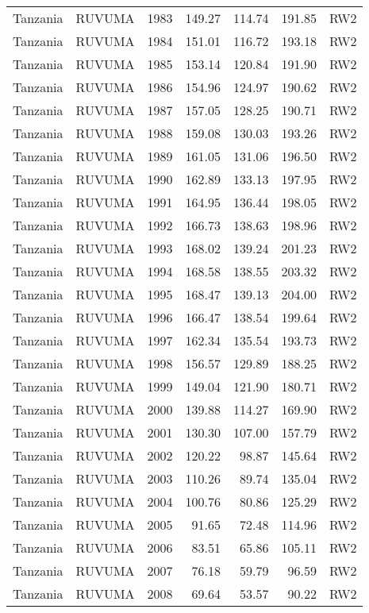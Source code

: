 \begin{longtable}{lllrrrl}
  Tanzania & RUVUMA & 1983 & 149.27 & 114.74 & 191.85 & RW2 \\ 
  Tanzania & RUVUMA & 1984 & 151.01 & 116.72 & 193.18 & RW2 \\ 
  Tanzania & RUVUMA & 1985 & 153.14 & 120.84 & 191.90 & RW2 \\ 
  Tanzania & RUVUMA & 1986 & 154.96 & 124.97 & 190.62 & RW2 \\ 
  Tanzania & RUVUMA & 1987 & 157.05 & 128.25 & 190.71 & RW2 \\ 
  Tanzania & RUVUMA & 1988 & 159.08 & 130.03 & 193.26 & RW2 \\ 
  Tanzania & RUVUMA & 1989 & 161.05 & 131.06 & 196.50 & RW2 \\ 
  Tanzania & RUVUMA & 1990 & 162.89 & 133.13 & 197.95 & RW2 \\ 
  Tanzania & RUVUMA & 1991 & 164.95 & 136.44 & 198.05 & RW2 \\ 
  Tanzania & RUVUMA & 1992 & 166.73 & 138.63 & 198.96 & RW2 \\ 
  Tanzania & RUVUMA & 1993 & 168.02 & 139.24 & 201.23 & RW2 \\ 
  Tanzania & RUVUMA & 1994 & 168.58 & 138.55 & 203.32 & RW2 \\ 
  Tanzania & RUVUMA & 1995 & 168.47 & 139.13 & 204.00 & RW2 \\ 
  Tanzania & RUVUMA & 1996 & 166.47 & 138.54 & 199.64 & RW2 \\ 
  Tanzania & RUVUMA & 1997 & 162.34 & 135.54 & 193.73 & RW2 \\ 
  Tanzania & RUVUMA & 1998 & 156.57 & 129.89 & 188.25 & RW2 \\ 
  Tanzania & RUVUMA & 1999 & 149.04 & 121.90 & 180.71 & RW2 \\ 
  Tanzania & RUVUMA & 2000 & 139.88 & 114.27 & 169.90 & RW2 \\ 
  Tanzania & RUVUMA & 2001 & 130.30 & 107.00 & 157.79 & RW2 \\ 
  Tanzania & RUVUMA & 2002 & 120.22 & 98.87 & 145.64 & RW2 \\ 
  Tanzania & RUVUMA & 2003 & 110.26 & 89.74 & 135.04 & RW2 \\ 
  Tanzania & RUVUMA & 2004 & 100.76 & 80.86 & 125.29 & RW2 \\ 
  Tanzania & RUVUMA & 2005 & 91.65 & 72.48 & 114.96 & RW2 \\ 
  Tanzania & RUVUMA & 2006 & 83.51 & 65.86 & 105.11 & RW2 \\ 
  Tanzania & RUVUMA & 2007 & 76.18 & 59.79 & 96.59 & RW2 \\ 
  Tanzania & RUVUMA & 2008 & 69.64 & 53.57 & 90.22 & RW2 \\ 

\end{longtable}
